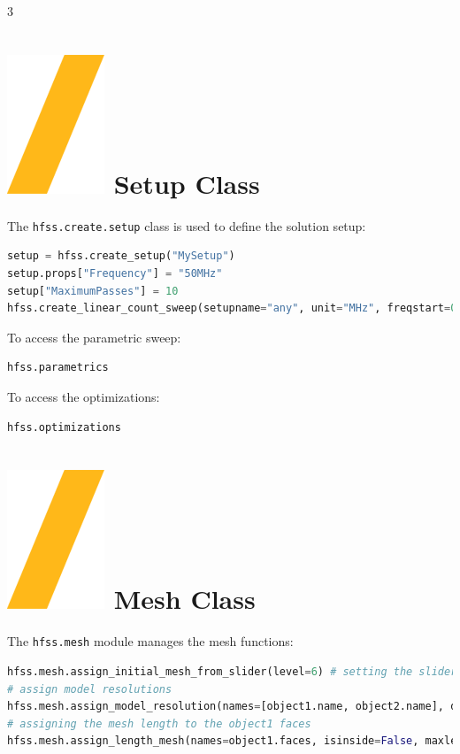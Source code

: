 \documentclass[9pt,landscape]{article}
\begin{document}
\begin{multicols}{3}
\section{\includegraphics[height=\fontcharht\font`\S]{slash.png} Setup Class}
The \texttt{hfss.create.setup} class is used to define the solution setup:

\begin{lstlisting}[language=Python]
setup = hfss.create_setup("MySetup")
setup.props["Frequency"] = "50MHz"
setup["MaximumPasses"] = 10
hfss.create_linear_count_sweep(setupname="any", unit="MHz", freqstart=0.1, freqstop=100, num_of_freq_points=100, sweepname="sweep1", sweep_type="Interpolating", save_fields=False)
\end{lstlisting}
To access the parametric sweep:
\begin{lstlisting}[language=Python]
hfss.parametrics
\end{lstlisting}
To access the optimizations:
\begin{lstlisting}[language=Python]
hfss.optimizations
\end{lstlisting}
\columnbreak
\section{\includegraphics[height=\fontcharht\font`\S]{slash.png} Mesh Class}
The \texttt{hfss.mesh} module manages the mesh functions:
\begin{lstlisting}[language=Python]
hfss.mesh.assign_initial_mesh_from_slider(level=6) # setting the slider level to 6
# assign model resolutions
hfss.mesh.assign_model_resolution(names=[object1.name, object2.name], defeature_length=None)
# assigning the mesh length to the object1 faces
hfss.mesh.assign_length_mesh(names=object1.faces, isinside=False, maxlength=1, maxel=2000)
\end{lstlisting}


\end{multicols}
\end{document}
